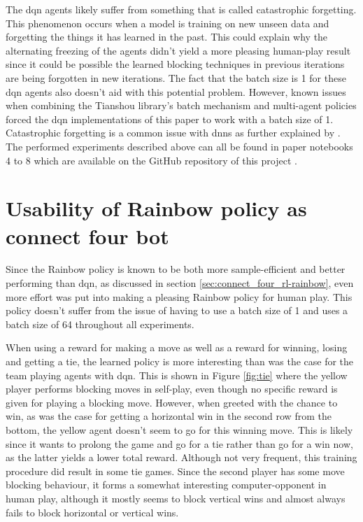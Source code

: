 The \gls{dqn} agents likely suffer from something that is called catastrophic forgetting.
This phenomenon occurs when a model is training on new unseen data and forgetting the things it has learned in the past.
This could explain why the alternating freezing of the agents didn't yield a more pleasing human-play result since it could be possible the learned blocking techniques in previous iterations are being forgotten in new iterations.
The fact that the batch size is 1 for these \gls{dqn} agents also doesn't aid with this potential problem.
However, known issues when combining the Tianshou library's batch mechanism and multi-agent policies forced the \gls{dqn} implementations of this paper to work with a batch size of 1.
Catastrophic forgetting is a common issue with \glspl{dnn} as further explained by \citet{catastrophic_forgetting}.
The performed experiments described above can all be found in paper notebooks 4 to 8 which are available on the GitHub repository of this project \citep{github_project}.


\section{Usability of Rainbow policy as connect four bot}
\label{sec:connect_four_eval-rainbow_vs_human}

Since the Rainbow policy is known to be both more sample-efficient and better performing than \gls{dqn}, as discussed in section \ref{sec:connect_four_rl-rainbow}, even more effort was put into making a pleasing Rainbow policy for human play.
This policy doesn't suffer from the issue of having to use a batch size of 1 and uses a batch size of 64 throughout all experiments.

When using a reward for making a move as well as a reward for winning, losing and getting a tie, the learned policy is more interesting than was the case for the team playing agents with \gls{dqn}.
This is shown in Figure \ref{fig:tie} where the yellow player performs blocking moves in self-play, even though no specific reward is given for playing a blocking move.
However, when greeted with the chance to win, as was the case for getting a horizontal win in the second row from the bottom, the yellow agent doesn't seem to go for this winning move.
This is likely since it wants to prolong the game and go for a tie rather than go for a win now, as the latter yields a lower total reward.
Although not very frequent, this training procedure did result in some tie games.
Since the second player has some move blocking behaviour, it forms a somewhat interesting computer-opponent in human play, although it mostly seems to block vertical wins and almost always fails to block horizontal or vertical wins.

